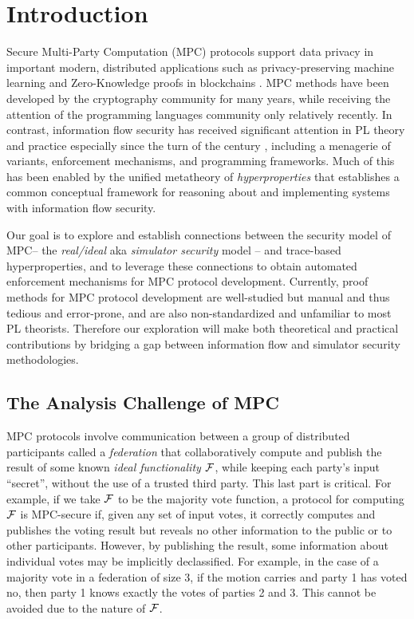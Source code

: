\section{Introduction}

Secure Multi-Party Computation (MPC) protocols support data privacy in
important modern, distributed applications such as privacy-preserving
machine learning and Zero-Knowledge proofs in blockchains \cite{XXX}
. MPC methods
have been developed by the cryptography community for many years,
while receiving the attention of the programming languages community
only relatively recently. In contrast, information flow security has
received significant attention in PL theory and practice especially
since the turn of the century \cite{1159651}, including a menagerie of
variants, enforcement mechanisms, and programming frameworks. Much of
this has been enabled by the unified metatheory of
\emph{hyperproperties} \cite{10.5555/1891823.1891830} that establishes
a common conceptual framework for reasoning about and implementing
systems with information flow security.

Our goal is to explore and establish connections between the security
model of MPC-- the \emph{real/ideal} aka \emph{simulator security}
model -- and trace-based hyperproperties, and to leverage these
connections to obtain automated enforcement mechanisms for MPC
protocol development. Currently, proof methods for MPC protocol
development are well-studied \cite{Lindell2017} but manual and 
thus tedious and error-prone, and are also non-standardized and
unfamiliar to most PL theorists. Therefore our exploration will
make both theoretical and practical contributions by bridging a gap between
information flow and simulator security methodologies.

\subsection{The Analysis Challenge of MPC}
MPC protocols involve communication
between a group of distributed participants called a \emph{federation}
that collaboratively compute and publish the result of some known
\emph{ideal functionality} $\mathcal{F}$, while keeping each party's input
``secret'', without the use of a trusted third party. This last part
is critical. For example, if we take $\mathcal{F}$ to be the majority vote
function, a protocol for computing $\mathcal{F}$ is MPC-secure if, given
any set of input votes, it correctly computes and publishes the voting
result but reveals no other information to the public or to other
participants. However, by publishing the result, some information
about individual votes may be implicitly declassified.  For example,
in the case of a majority vote in a federation of size 3, if the
motion carries and party 1 has voted no, then party 1 knows exactly
the votes of parties 2 and 3. This cannot be avoided due to the nature
of $\mathcal{F}$.

